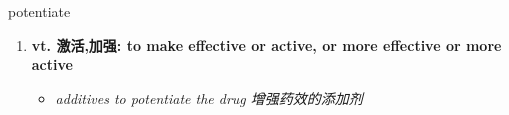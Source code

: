 
\begin{frame}
{\huge potentiate}
\begin{center}
\begin{enumerate}\Large
  \item \textbf{vt. 激活,加强: to make effective or active, or more effective or more active}
  \begin{itemize}
    \item \em{\Large{additives to potentiate the drug 增强药效的添加剂}}
  \end{itemize}
\end{enumerate}
\end{center}
\end{frame}
